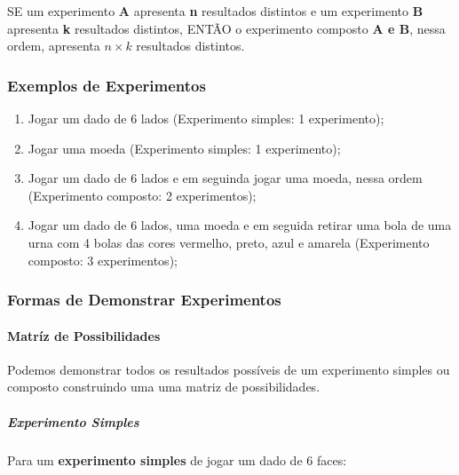 \documentclass[
]{book}
\providecommand{\tightlist}{%
  \setlength{\itemsep}{0pt}\setlength{\parskip}{0pt}}
\begin{document}
SE um experimento \textbf{A} apresenta \textbf{n} resultados distintos e um experimento \textbf{B} apresenta \textbf{k} resultados distintos, ENTÃO o experimento composto \textbf{A e B}, nessa ordem, apresenta \(n \times k\) resultados distintos.

\hypertarget{exemplos-de-experimentos}{%
\subsubsection*{Exemplos de Experimentos}\label{exemplos-de-experimentos}}

\begin{enumerate}
\def\labelenumi{\arabic{enumi}.}
\tightlist
\item
  Jogar um dado de 6 lados (Experimento simples: 1 experimento);
\item
  Jogar uma moeda (Experimento simples: 1 experimento);
\item
  Jogar um dado de 6 lados e em seguinda jogar uma moeda, nessa ordem (Experimento composto: 2 experimentos);
\item
  Jogar um dado de 6 lados, uma moeda e em seguida retirar uma bola de uma urna com 4 bolas das cores vermelho, preto, azul e amarela (Experimento composto: 3 experimentos);
\end{enumerate}

\hypertarget{formas-de-demonstrar-experimentos}{%
\subsubsection*{Formas de Demonstrar Experimentos}\label{formas-de-demonstrar-experimentos}}

\hypertarget{matruxedz-de-possibilidades}{%
\paragraph{Matríz de Possibilidades}\label{matruxedz-de-possibilidades}}

Podemos demonstrar todos os resultados possíveis de um experimento simples ou composto construindo uma uma matriz de possibilidades.

\hypertarget{experimento-simples}{%
\subparagraph{Experimento Simples}\label{experimento-simples}}

Para um \textbf{experimento simples} de jogar um dado de 6 faces:
\end{document}
